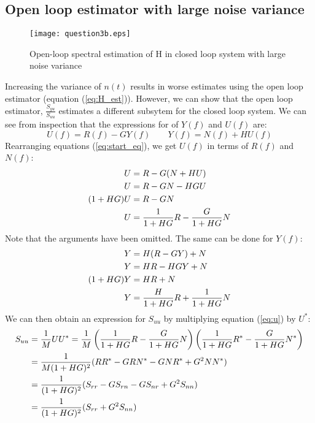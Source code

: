 \documentclass[11pt,a4paper]{article}
\begin{document}
\subsection{Open loop estimator with large noise variance}
\begin{figure}
    \begin{center}
        \texttt{[image: question3b.eps]}
    \end{center}
    \caption{Open-loop spectral estimation of H in closed loop system with
    large noise variance}
    \label{fig:3b}
\end{figure}
Increasing the variance of $n(t)$ results in worse estimates using the open
loop estimator (equation (\ref{eq:H_est})). However, we can show that the open
loop estimator, $\frac{S_{yu}}{S_{uu}}$ estimates a different subsytem for the
closed loop system. We can see from inspection that the expressions for of
$Y(f)$ and $U(f)$ are:
\begin{equation}
    U(f) = R(f) - GY(f) \qquad Y(f) = N(f) + HU(f) \label{eq:start_eq}
\end{equation}
Rearranging equations (\ref{eq:start_eq}), we get $U(f)$ in terms of
$R(f)$ and $N(f)$:
\begin{align}
    U &= R - G(N + HU) \notag \\
    U &= R - GN - HGU \notag \\
    (1 + HG)U &= R - GN \notag \\
    U &= \frac{1}{1 + HG}R - \frac{G}{1 + HG}N \label{eq:u}
\end{align}
Note that the arguments have been omitted. The same can be done for $Y(f)$:
\begin{align}
    Y &= H(R - GY) + N \notag \\
    Y &= HR - HGY + N \notag \\
    (1 + HG)Y &= HR + N \notag \\
    Y &= \frac{H}{1 + HG}R + \frac{1}{1 + HG}N  \label{eq:y}
\end{align}
We can then obtain an expression for $S_{uu}$ by multiplying equation
(\ref{eq:u}) by $U^*$:
\begin{align}
    S_{uu} &= \frac{1}{M}UU^* =
        \frac{1}{M}\left( \frac{1}{1 + HG}R - \frac{G}{1 + HG}N\right)
        \left(\frac{1}{1 + HG}R^* - \frac{G}{1 + HG}N^*\right) \notag \\
    &= \frac{1}{M(1+HG)^2}(RR^* - GRN^* - GNR^* + G^2NN^*) \notag \\
    &= \frac{1}{(1+HG)^2}(S_{rr} - GS_{rn} - GS_{nr} + G^2S_{nn}) \notag \\
    &= \frac{1}{(1+HG)^2}(S_{rr} + G^2S_{nn}) \label{eq:Suu}
\end{align}
\end{document}
